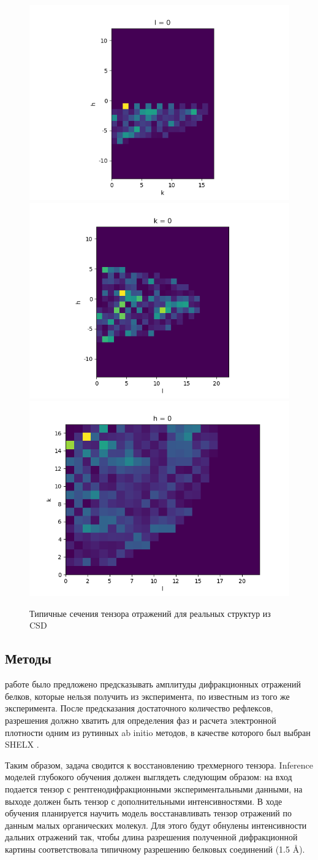 \begin{figure}[ht!]
            \includegraphics[width=.3\textwidth]{figures/hk_plane_l_0.png}\hfill
            \includegraphics[width=.3\textwidth]{figures/hl_plane_k_0.png}\hfill
            \includegraphics[width=.3\textwidth]{figures/kl_plane_h_0.png}
            \caption{Типичные сечения тензора отражений для реальных структур из CSD}
            \label{locally}
\end{figure}

\subsection{Методы}

 работе было предложено предсказывать амплитуды дифракционных отражений белков, которые нельзя получить из эксперимента, по известным из того же эксперимента. После предсказания достаточного количество рефлексов, разрешения должно хватить для определения фаз и расчета электронной плотности одним из рутинных ab initio методов, в качестве которого был выбран SHELX \cite{shelx}.

Таким образом, задача сводится к восстановлению трехмерного тензора. Inference моделей глубокого обучения должен выглядеть следующим образом: на вход подается тензор с рентгенодифракционными экспериментальными данными, на выходе должен быть тензор с дополнительными интенсивностями. В ходе обучения планируется научить модель восстанавливать тензор отражений по данным малых органических молекул. Для этого будут обнулены интенсивности дальних отражений так, чтобы длина разрешения полученной дифракционной картины соответствовала типичному разрешению белковых соединений (1.5 Å).

